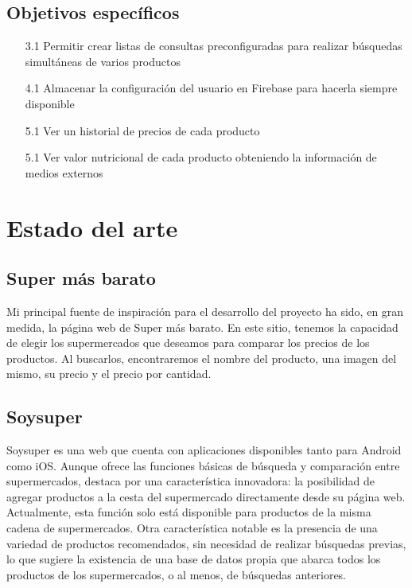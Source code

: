 \documentclass[12pt,twoside,titlepage]{report}
\newcommand\blankpage{%
    \newpage
    \null
    \thispagestyle{empty}%
    \newpage}
\begin{document}
\section{Objetivos específicos}

\begin{itemize}

	\item[3.1] Permitir crear listas de consultas preconfiguradas para realizar búsquedas simultáneas de varios productos
	\item[4.1] Almacenar la configuración del usuario en Firebase para hacerla siempre disponible
	\item[5.1] Ver un historial de precios de cada producto
	\item[5.1] Ver valor nutricional de cada producto obteniendo la información de medios externos

\end{itemize}

\blankpage


\chapter{Estado del arte}

\section{Super más barato}

Mi principal fuente de inspiración para el desarrollo del proyecto ha sido, en gran medida, la página web de Super más barato\cite{Super más barato}. En este sitio, tenemos la capacidad de elegir los supermercados que deseamos para comparar los precios de los productos. Al buscarlos, encontraremos el nombre del producto, una imagen del mismo, su precio y el precio por cantidad.

\section{Soysuper}

Soysuper\cite{Soysuper} es una web que cuenta con aplicaciones disponibles tanto para Android como iOS. Aunque ofrece las funciones básicas de búsqueda y comparación entre supermercados, destaca por una característica innovadora: la posibilidad de agregar productos a la cesta del supermercado directamente desde su página web. Actualmente, esta función solo está disponible para productos de la misma cadena de supermercados. Otra característica notable es la presencia de una variedad de productos recomendados, sin necesidad de realizar búsquedas previas, lo que sugiere la existencia de una base de datos propia que abarca todos los productos de los supermercados, o al menos, de búsquedas anteriores.
\end{document}
